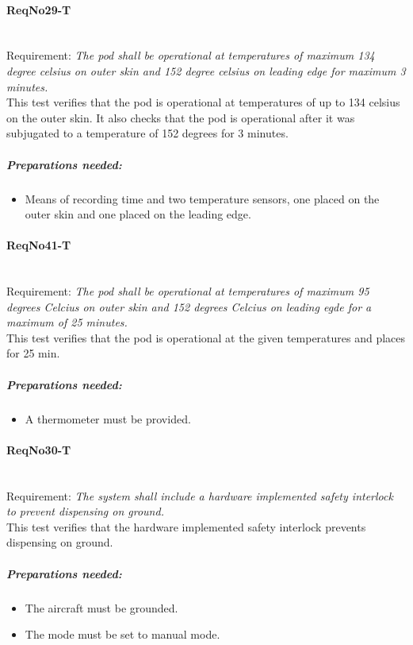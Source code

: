 \paragraph{ReqNo29-T}\mbox{}\\ %
Requirement: \textit{The pod shall be operational at temperatures of maximum 134 degree celsius on outer skin and 152 degree celsius on leading edge for maximum 3 minutes.}
\\
This test verifies that the pod is operational at temperatures of up to 134 celsius on the outer skin. It also checks that the pod is operational after it was subjugated to a temperature of 152 degrees for 3 minutes.
\\
	\subparagraph{Preparations needed:}
	\begin{itemize}
	\item Means of recording time and two temperature sensors, one placed on the outer skin and one placed on the leading edge.
	\end{itemize} 


\paragraph{ReqNo41-T}\mbox{}\\ %
Requirement: \textit{The pod shall be operational at temperatures of maximum 95 degrees Celcius on outer skin and 152 degrees Celcius on leading egde for a maximum of 25 minutes.}\\
This test verifies that the pod is operational at the given temperatures and places for 25 min.\\

	\subparagraph{Preparations needed:}
	\begin{itemize}
	\item A thermometer must be provided.
	\end{itemize} 
	
\paragraph{ReqNo30-T}\mbox{}\\ %
Requirement: \textit{The system shall include a hardware implemented safety interlock to prevent dispensing on ground.}\\

This test verifies that the hardware implemented safety interlock prevents dispensing on ground.
	\subparagraph{Preparations needed:}
	\begin{itemize}
	\item The aircraft must be grounded.
	\item The mode must be set to manual mode.
	\end{itemize}

